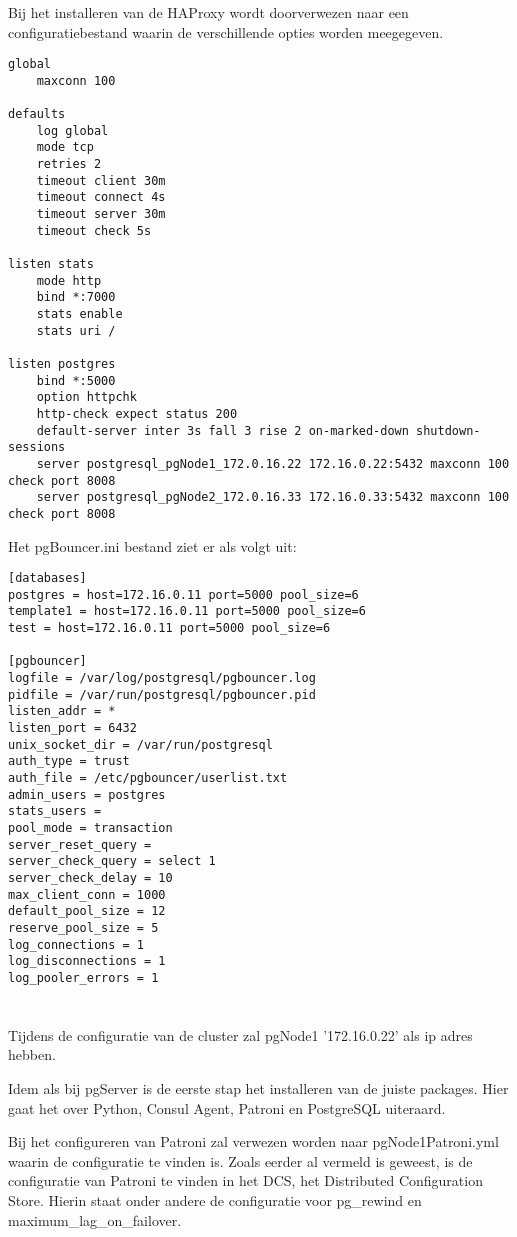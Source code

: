 Bij het installeren van de HAProxy wordt doorverwezen naar een configuratiebestand waarin de verschillende opties worden meegegeven.

\begin{lstlisting}
global
    maxconn 100

defaults
    log global
    mode tcp
    retries 2
    timeout client 30m
    timeout connect 4s
    timeout server 30m
    timeout check 5s

listen stats
    mode http
    bind *:7000
    stats enable
    stats uri /

listen postgres
    bind *:5000
    option httpchk
    http-check expect status 200
    default-server inter 3s fall 3 rise 2 on-marked-down shutdown-sessions
    server postgresql_pgNode1_172.0.16.22 172.16.0.22:5432 maxconn 100 check port 8008
    server postgresql_pgNode2_172.0.16.33 172.16.0.33:5432 maxconn 100 check port 8008
\end{lstlisting}

Het pgBouncer.ini bestand ziet er als volgt uit:

\begin{lstlisting}
[databases]
postgres = host=172.16.0.11 port=5000 pool_size=6
template1 = host=172.16.0.11 port=5000 pool_size=6
test = host=172.16.0.11 port=5000 pool_size=6

[pgbouncer]
logfile = /var/log/postgresql/pgbouncer.log
pidfile = /var/run/postgresql/pgbouncer.pid
listen_addr = *
listen_port = 6432
unix_socket_dir = /var/run/postgresql
auth_type = trust
auth_file = /etc/pgbouncer/userlist.txt
admin_users = postgres
stats_users =
pool_mode = transaction
server_reset_query =
server_check_query = select 1
server_check_delay = 10
max_client_conn = 1000
default_pool_size = 12
reserve_pool_size = 5
log_connections = 1
log_disconnections = 1
log_pooler_errors = 1  
\end{lstlisting}


\section{}
\label{sec:pgNode1}
Tijdens de configuratie van de cluster zal pgNode1 '172.16.0.22' als ip adres hebben.


Idem als bij pgServer is de eerste stap het installeren van de juiste packages. Hier gaat het over Python, Consul Agent, Patroni en PostgreSQL uiteraard.

Bij het configureren van Patroni zal verwezen worden naar pgNode1Patroni.yml waarin de configuratie te vinden is. Zoals eerder al vermeld is geweest, is de configuratie van Patroni te vinden in het DCS, het Distributed Configuration Store. Hierin staat onder andere de configuratie voor pg\_rewind en  maximum\_lag\_on\_failover.


